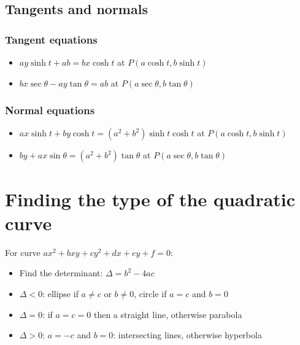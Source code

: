 \subsection{Tangents and normals}
\subsubsection{Tangent equations}
\begin{itemize}
    \item $ay\sinh t + ab = bx\cosh t$ at $P(a\cosh t, b\sinh t)$
    \item $bx\sec\theta-ay\tan\theta = ab$ at $P(a\sec\theta, b\tan\theta)$
\end{itemize}
\subsubsection{Normal equations}
\begin{itemize}
    \item $ax\sinh t + by\cosh t = (a^2+b^2)\sinh t\cosh t$ at $P(a\cosh t, b\sinh t)$
    \item $by + ax\sin\theta = (a^2+b^2)\tan\theta$ at $P(a\sec\theta, b\tan\theta)$
\end{itemize}

\section{Finding the type of the quadratic curve}
For curve $ax^2+bxy+cy^2+dx+ey+f=0$:
\begin{itemize}
    \item Find the determinant: $\Delta = b^2-4ac$
    \item $\Delta < 0$: ellipse if $a\neq c$ or $b\neq 0$, circle if $a=c$ and $b=0$
    \item $\Delta = 0$: if $a=c=0$ then a straight line, otherwise parabola
    \item $\Delta > 0$: $a=-c$ and $b=0$: intersecting lines, otherwise hyperbola
\end{itemize}